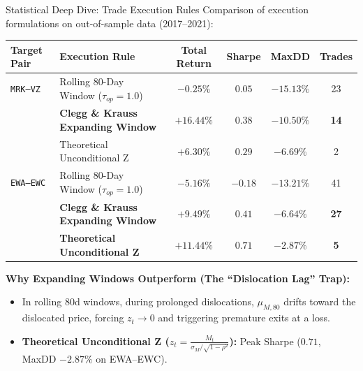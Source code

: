 \documentclass[10pt, aspectratio=169]{beamer}
\begin{document}
\begin{frame}{Statistical Deep Dive: Trade Execution Rules}
  Comparison of execution formulations on out-of-sample data (2017--2021):
  \vspace{4pt}
  \begin{table}
    \centering\small
    \begin{tabular}{@{}llcccc@{}}
      \toprule
      \textbf{Target Pair} & \textbf{Execution Rule} & \textbf{Total Return} & \textbf{Sharpe} & \textbf{MaxDD} & \textbf{Trades} \\
      \midrule
      \texttt{MRK--VZ} & Rolling 80-Day Window ($\tau_{op}=1.0$) & $-0.25\%$ & $0.05$ & $-15.13\%$ & 23 \\
      & \textbf{Clegg \& Krauss Expanding Window} & $\mathbf{+16.44\%}$ & $\mathbf{0.38}$ & $\mathbf{-10.50\%}$ & \textbf{14} \\
      & Theoretical Unconditional Z & $+6.30\%$ & $0.29$ & $-6.69\%$ & 2 \\
      \midrule
      \texttt{EWA--EWC} & Rolling 80-Day Window ($\tau_{op}=1.0$) & $-5.16\%$ & $-0.18$ & $-13.21\%$ & 41 \\
      & \textbf{Clegg \& Krauss Expanding Window} & $\mathbf{+9.49\%}$ & $\mathbf{0.41}$ & $\mathbf{-6.64\%}$ & \textbf{27} \\
      & \textbf{Theoretical Unconditional Z} & $\mathbf{+11.44\%}$ & $\mathbf{0.71}$ & $\mathbf{-2.87\%}$ & \textbf{5} \\
      \bottomrule
    \end{tabular}
  \end{table}
  \vspace{4pt}
  \textbf{Why Expanding Windows Outperform (The ``Dislocation Lag'' Trap):}
  \begin{itemize}
    \item In rolling 80d windows, during prolonged dislocations, $\mu_{M,80}$ drifts toward the dislocated price, forcing $z_t \to 0$ and triggering premature exits at a loss.
    \item \textbf{Theoretical Unconditional Z ($z_t = \frac{M_t}{\sigma_M / \sqrt{1-\rho^2}}$):} Peak Sharpe ($\mathbf{0.71}$, MaxDD $\mathbf{-2.87\%}$ on EWA--EWC).
  \end{itemize}
\end{frame}
\end{document}
